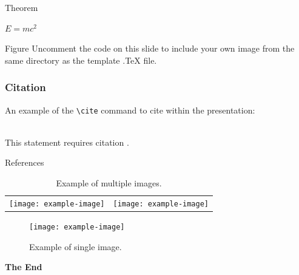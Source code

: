 \documentclass[aspectratio=169,xcolor=dvipsnames]{beamer}
\begin{document}

\begin{frame}{Theorem}
    \begin{theorem}
        $E = mc^2$
    \end{theorem}
\end{frame}


\begin{frame}{Figure}
    Uncomment the code on this slide to include your own image from the same directory as the template .TeX file.
\end{frame}


\begin{frame}[fragile] %
    \frametitle{Citation}
    An example of the \verb|\cite| command to cite within the presentation:\\~

    This statement requires citation \cite{p1}.
\end{frame}


\begin{frame}{References}

    \begin{table}
        \centering
        \begin{tabular}{cc}
            \texttt{[image: example-image]} &
            \texttt{[image: example-image]} \\
        \end{tabular}
        \caption{Example of multiple images.}
        \label{tab:1}
    \end{table}
\end{frame}


\begin{frame}

    \begin{figure}
        \centering
        \texttt{[image: example-image]}
        \caption{Example of single image.}
        \label{fig:1}
    \end{figure}

    \Huge{\centerline{\textbf{The End}}}
\end{frame}

\end{document}
